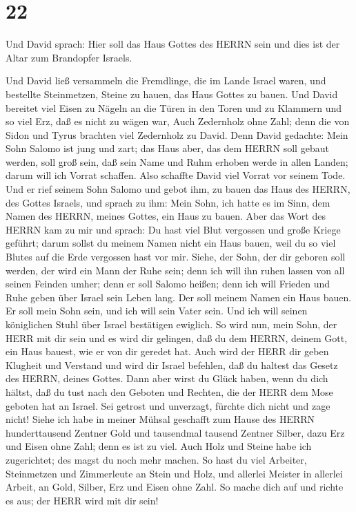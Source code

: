 \hypertarget{section-21}{%
\section{22}\label{section-21}}

 Und David sprach: Hier soll das Haus Gottes des HERRN sein
und dies ist der Altar zum Brandopfer Israels.

 Und David ließ versammeln die Fremdlinge, die im Lande
Israel waren, und bestellte Steinmetzen, Steine zu hauen, das Haus
Gottes zu bauen.  Und David bereitet viel Eisen zu Nägeln an
die Türen in den Toren und zu Klammern und so viel Erz, daß es nicht zu
wägen war,  Auch Zedernholz ohne Zahl; denn die von Sidon
und Tyrus brachten viel Zedernholz zu David.  Denn David
gedachte: Mein Sohn Salomo ist jung und zart; das Haus aber, das dem
HERRN soll gebaut werden, soll groß sein, daß sein Name und Ruhm erhoben
werde in allen Landen; darum will ich Vorrat schaffen. Also schaffte
David viel Vorrat vor seinem Tode.  Und er rief seinem Sohn
Salomo und gebot ihm, zu bauen das Haus des HERRN, des Gottes Israels,
 und sprach zu ihm: Mein Sohn, ich hatte es im Sinn, dem
Namen des HERRN, meines Gottes, ein Haus zu bauen.  Aber das
Wort des HERRN kam zu mir und sprach: Du hast viel Blut vergossen und
große Kriege geführt; darum sollst du meinem Namen nicht ein Haus bauen,
weil du so viel Blutes auf die Erde vergossen hast vor mir. 
Siehe, der Sohn, der dir geboren soll werden, der wird ein Mann der Ruhe
sein; denn ich will ihn ruhen lassen von all seinen Feinden umher; denn
er soll Salomo heißen; denn ich will Frieden und Ruhe geben über Israel
sein Leben lang.  Der soll meinem Namen ein Haus bauen. Er
soll mein Sohn sein, und ich will sein Vater sein. Und ich will seinen
königlichen Stuhl über Israel bestätigen ewiglich.  So wird
nun, mein Sohn, der HERR mit dir sein und es wird dir gelingen, daß du
dem HERRN, deinem Gott, ein Haus bauest, wie er von dir geredet hat.
 Auch wird der HERR dir geben Klugheit und Verstand und
wird dir Israel befehlen, daß du haltest das Gesetz des HERRN, deines
Gottes.  Dann aber wirst du Glück haben, wenn du dich
hältst, daß du tust nach den Geboten und Rechten, die der HERR dem Mose
geboten hat an Israel. Sei getrost und unverzagt, fürchte dich nicht und
zage nicht!  Siehe ich habe in meiner Mühsal geschafft zum
Hause des HERRN hunderttausend Zentner Gold und tausendmal tausend
Zentner Silber, dazu Erz und Eisen ohne Zahl; denn es ist zu viel. Auch
Holz und Steine habe ich zugerichtet; des magst du noch mehr machen.
 So hast du viel Arbeiter, Steinmetzen und Zimmerleute an
Stein und Holz, und allerlei Meister in allerlei Arbeit, 
an Gold, Silber, Erz und Eisen ohne Zahl. So mache dich auf und richte
es aus; der HERR wird mit dir sein!

